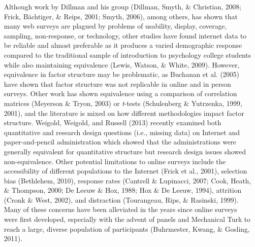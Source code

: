 \documentclass[english,man, mask]{apa6}
\theoremstyle{definition}
\theoremstyle{definition}
\theoremstyle{definition}
\theoremstyle{remark}
\begin{document}
Although work by Dillman and his group (Dillman, Smyth, \& Christian,
2008; Frick, Bächtiger, \& Reips, 2001; Smyth, 2006), among others, has
shown that many web surveys are plagued by problems of usability,
display, coverage, sampling, non-response, or technology, other studies
have found internet data to be reliable and almost preferable as it
produces a varied demographic response compared to the traditional
sample of introduction to psychology college students while also
maintaining equivalence (Lewis, Watson, \& White, 2009). However,
equivalence in factor structure may be problematic, as Buchanan et al.
(2005) have shown that factor structure was not replicable in online and
in person surveys. Other work has shown equivalence using a comparison
of correlation matrices (Meyerson \& Tryon, 2003) or \emph{t}-tests
(Schulenberg \& Yutrzenka, 1999, 2001), and the literature is mixed on
how different methodologies impact factor structure. Weigold, Weigold,
and Russell (2013) recently examined both quantitative and research
design questions (i.e., missing data) on Internet and paper-and-pencil
administration which showed that the administrations were generally
equivalent for quantitative structure but research design issues showed
non-equivalence. Other potential limitations to online surveys include
the accessibility of different populations to the Internet (Frick et
al., 2001), selection bias (Bethlehem, 2010), response rates (Cantrell
\& Lupinacci, 2007; Cook, Heath, \& Thompson, 2000; De Leeuw \& Hox,
1988; Hox \& De Leeuw, 1994), attrition (Cronk \& West, 2002), and
distraction (Tourangeau, Rips, \& Rasinski, 1999). Many of these
concerns have been alleviated in the years since online surveys were
first developed, especially with the advent of panels and Mechanical
Turk to reach a large, diverse population of participants (Buhrmester,
Kwang, \& Gosling, 2011).
\end{document}
